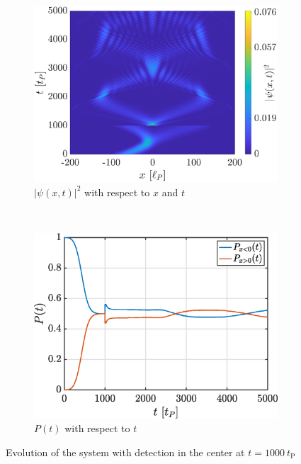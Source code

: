 \documentclass[a4paper,12pt,twoside]{article}
\begin{document}
      \begin{figure}[h]
        \centering
        \begin{subfigure}[t]{0.45\textwidth}
          \includegraphics[width=\textwidth]{graphs/bonus1_evo.eps}
          \caption{$|\psi(x, t)|^2$ with respect to $x$ and $t$}
          \label{fig:bonus1_evo}
        \end{subfigure}
        ~
        \begin{subfigure}[t]{0.45\textwidth}
          \includegraphics[width=\textwidth]{graphs/bonus1_prob.eps}
          \caption{$P(t)$ with respect to $t$}
          \label{fig:bonus1_prob}
        \end{subfigure}
        \caption{Evolution of the system with detection in the center at $t=1000~t_\text{P}$}
        \label{fig:bonus1}
      \end{figure}
      
\end{document}
